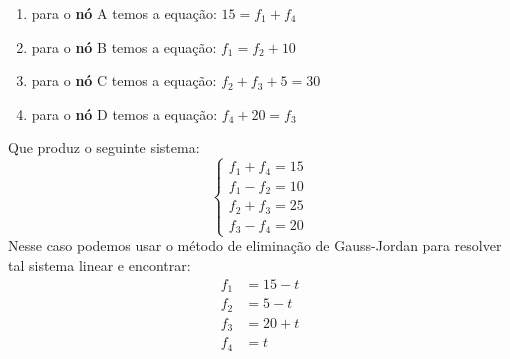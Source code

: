 \documentclass{beamer}
\begin{document}
    \begin{frame}
        \begin{figure}[!h]
            \centering
            
        \end{figure}
    \end{frame}

    \begin{frame}
        \begin{enumerate}[label={\roman*})]
            \item para o \textbf{nó} A temos a equação: \pause $15 = f_1 + f_4$\pause
            \item para o \textbf{nó} B temos a equação: \pause $f_1 = f_2 + 10$\pause
            \item para o \textbf{nó} C temos a equação: \pause $f_2 + f_3 + 5 = 30$\pause
            \item para o \textbf{nó} D temos a equação: \pause $f_4 + 20 = f_3$
        \end{enumerate}
    \end{frame}

    \begin{frame}
        Que produz o seguinte sistema:
        \[
            \begin{cases}
                f_1 + f_4 = 15\\
                f_1 - f_2 = 10\\
                f_2 + f_3 = 25\\
                f_3 - f_4 = 20
            \end{cases}
        \]\pause
        Nesse caso podemos usar o método de eliminação de Gauss-Jordan para resolver tal sistema linear e encontrar:
        \begin{align*}
            f_1 &= 15 - t\\
            f_2 &= 5 - t\\
            f_3 &= 20 + t\\
            f_4 &= t
        \end{align*}
    \end{frame}
\end{document}
